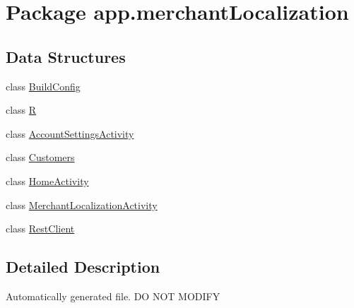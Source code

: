 \hypertarget{namespaceapp_1_1merchant_localization}{\section{Package app.\-merchant\-Localization}
\label{namespaceapp_1_1merchant_localization}
}
\subsection*{Data Structures}
\begin{DoxyCompactItemize}
\item 
class \hyperlink{classapp_1_1merchant_localization_1_1_build_config}{Build\-Config}
\item 
class \hyperlink{classapp_1_1merchant_localization_1_1_r}{R}
\item 
class \hyperlink{classapp_1_1merchant_localization_1_1_account_settings_activity}{Account\-Settings\-Activity}
\item 
class \hyperlink{classapp_1_1merchant_localization_1_1_customers}{Customers}
\item 
class \hyperlink{classapp_1_1merchant_localization_1_1_home_activity}{Home\-Activity}
\item 
class \hyperlink{classapp_1_1merchant_localization_1_1_merchant_localization_activity}{Merchant\-Localization\-Activity}
\item 
class \hyperlink{classapp_1_1merchant_localization_1_1_rest_client}{Rest\-Client}
\end{DoxyCompactItemize}


\subsection{Detailed Description}
Automatically generated file. D\-O N\-O\-T M\-O\-D\-I\-F\-Y 